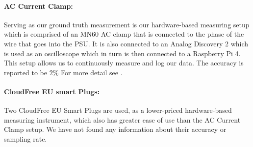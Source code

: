 \paragraph{AC Current Clamp:}
Serving as our ground truth measurement is our hardware-based measuring setup which is comprised of an MN60 AC clamp that is connected to the phase of the wire that goes into the PSU. It is also connected to an Analog Discovery 2 which is used as an oscilloscope which in turn is then connected to a Raspberry Pi 4. This setup allows us to continuously measure and log our data. The accuracy is reported to be $2\%$ For more detail see \cite{biksbois}.

\paragraph{CloudFree EU smart Plugs:}
Two CloudFree EU Smart Plugs\cite{CloudFreeEUSMartPlug} are used, as a lower-priced hardware-based measuring instrument, which also has greater ease of use than the AC Current Clamp setup. We have not found any information about their accuracy or sampling rate.